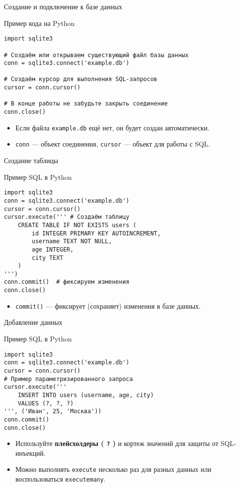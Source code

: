\documentclass{beamer}
\begin{document}
\begin{frame}[fragile]{Создание и подключение к базе данных}
	\begin{block}{Пример кода на Python}
		\begin{verbatim}
import sqlite3

# Создаём или открываем существующий файл базы данных
conn = sqlite3.connect('example.db')

# Создаём курсор для выполнения SQL-запросов
cursor = conn.cursor()

# В конце работы не забудьте закрыть соединение
conn.close()
\end{verbatim}
	\end{block}

	\begin{itemize}
		\item Если файла \texttt{example.db} ещё нет, он будет создан автоматически.
		\item \texttt{conn} — объект соединения, \texttt{cursor} — объект для работы с SQL.
	\end{itemize}
\end{frame}

\begin{frame}[fragile]{Создание таблицы}
	\begin{block}{Пример SQL в Python}
		\begin{verbatim}
import sqlite3
conn = sqlite3.connect('example.db')
cursor = conn.cursor()
cursor.execute(''' # Создаём таблицу
    CREATE TABLE IF NOT EXISTS users (
        id INTEGER PRIMARY KEY AUTOINCREMENT,
        username TEXT NOT NULL,
        age INTEGER,
        city TEXT
    )
''')
conn.commit()  # фиксируем изменения
conn.close()
\end{verbatim}
	\end{block}

	\begin{itemize}
		\item \texttt{commit()} — фиксирует (сохраняет) изменения в базе данных.
	\end{itemize}
\end{frame}

\begin{frame}[fragile]{Добавление данных}
	\begin{block}{Пример SQL в Python}
		\begin{verbatim}
import sqlite3
conn = sqlite3.connect('example.db')
cursor = conn.cursor()
# Пример параметризированного запроса
cursor.execute('''
    INSERT INTO users (username, age, city)
    VALUES (?, ?, ?)
''', ('Иван', 25, 'Москва'))
conn.commit()
conn.close()
\end{verbatim}
	\end{block}

	\begin{itemize}
		\item Используйте \textbf{плейсхолдеры ( \texttt{?} )} и кортеж значений для защиты от SQL-инъекций.
		\item Можно выполнять \texttt{execute} несколько раз для разных данных или воспользоваться \texttt{executemany}.
	\end{itemize}
\end{frame}
\end{document}
